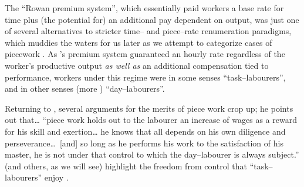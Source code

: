 \documentclass[trackingWork]{subfiles}
\begin{document}
The ``Rowan premium system'',
which essentially paid workers
a base rate for time plus
(the potential for) an additional pay dependent on output,
was just one of several alternatives to stricter time-- and piece--rate renumeration paradigms, which
muddies the waters for us later as we attempt to categorize cases of piecework
\cite{rowan1901premium}.
As \citeauthor{rowan1901premium}'s premium system guaranteed an hourly rate
regardless of the worker's productive output
\textit{as well as} an additional compensation tied to performance,
workers under this regime were in some senses ``task--labourers'',
and in other senses
(more )
``day--labourers''.

Returning to
\citeauthor{hughRaynbirdTaskWork}, several arguments for the merits of piece work %
crop up; he points out that\dots
``piece work holds out to the labourer an increase of wages as a reward for his skill and exertion\dots
he knows that all depends on his own diligence and perseverance\dots~[and]
so long as he performs his work to the satisfaction of his master,
he is not under that control to which the day--labourer is always subject.''
\citeauthor{hughRaynbirdTaskWork} (and others, as we will see)
highlight the freedom from control that ``task--labourers'' enjoy
\cite{hughRaynbirdTaskWork,rowan1901premium}.
\end{document}
